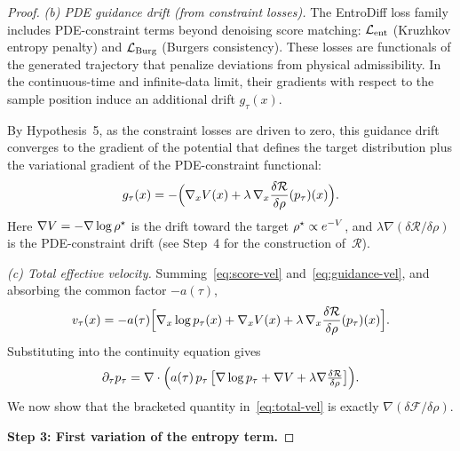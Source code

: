 \begin{proof}
\smallskip
\noindent\textit{(b)  PDE guidance drift (from constraint losses).}
The EntroDiff loss family includes PDE-constraint terms beyond denoising score matching:
$\mathcal{L}_{\mathrm{ent}}$ (Kruzhkov entropy penalty) and $\mathcal{L}_{\mathrm{Burg}}$ (Burgers consistency).
These losses are functionals of the generated trajectory that penalize deviations from
physical admissibility.
In the continuous-time and infinite-data limit, their gradients with respect to the sample
position induce an additional drift $g_{\tau}(x)$.

By Hypothesis~5, as the constraint losses are driven to zero, this guidance drift converges
to the gradient of the potential that defines the target distribution plus the variational
gradient of the PDE-constraint functional:
\begin{equation}
\label{eq:guidance-vel}
g_{\tau}(x) = - \Bigl( \nabla_x V(x) + \lambda\,\nabla_x\frac{\delta\mathcal{R}}{\delta\rho}(p_{\tau})(x) \Bigr).
\end{equation}
Here $\nabla V = -\nabla\log\rho^{\star}$ is the drift toward the target $\rho^{\star} \propto e^{-V}$,
and $\lambda\nabla(\delta\mathcal{R}/\delta\rho)$ is the PDE-constraint drift
(see Step~4 for the construction of~$\mathcal{R}$).

\smallskip
\noindent\textit{(c)  Total effective velocity.}
Summing~\eqref{eq:score-vel} and~\eqref{eq:guidance-vel}, and absorbing the common
factor $-a(\tau)$,
\begin{equation}
\label{eq:total-vel}
v_{\tau}(x)
  = -a(\tau)\Bigl[
      \nabla_x\log p_{\tau}(x)
      + \nabla_x V(x)
      + \lambda\,\nabla_x\frac{\delta\mathcal{R}}{\delta\rho}(p_{\tau})(x)
    \Bigr].
\end{equation}
Substituting into the continuity equation gives
\begin{equation}
\label{eq:cont-with-vel}
\partial_{\tau} p_{\tau}
  = \nabla \cdot \Bigl(
      a(\tau)\,p_{\tau}\,
      \bigl[ \nabla\log p_{\tau} + \nabla V + \lambda\nabla\tfrac{\delta\mathcal{R}}{\delta\rho} \bigr]
    \Bigr).
\end{equation}
We now show that the bracketed quantity in~\eqref{eq:total-vel} is exactly
$\nabla(\delta\mathcal{F}/\delta\rho)$.

\medskip
\noindent\textbf{Step 3: First variation of the entropy term.}


\end{proof}
